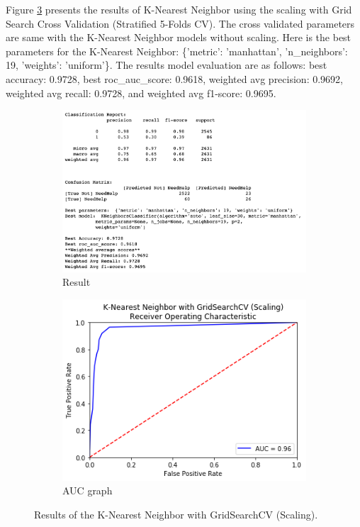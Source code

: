 \documentclass[11pt]{article}
\begin{document}
\begin{itemize}
%
Figure \ref{fig:knear_gridcv} presents 
the results of K-Nearest Neighbor using the scaling with Grid Search Cross Validation (Stratified 5-Folds CV). The cross validated parameters are same with the K-Nearest Neighbor models without scaling.
%
Here is the best parameters for the K-Nearest Neighbor: 
\{'metric': 'manhattan', 'n\_neighbors': 19, 'weights': 'uniform'\}.
%
The results model evaluation are as follows:
best accuracy: 0.9728,
best roc\_auc\_score: 0.9618,
weighted avg precision: 0.9692,
weighted avg recall: 0.9728, and
weighted avg f1-score: 0.9695.
%
\begin{figure}[h]
\centering
\begin{subfigure}{0.6\textwidth}
         \centering
         \includegraphics[width=\textwidth]{knear_gridcv.png}
         \caption{Result}
         \label{fig:knear_gridcv_report}
\end{subfigure}
\hfill
\begin{subfigure}{0.38\textwidth}
         \centering
         \includegraphics[width=\textwidth]{knear_gridcv_auc.png}
         \caption{AUC graph}
         \label{fig:knear_gridcv_auc}
\end{subfigure}
\caption{Results of the K-Nearest Neighbor with GridSearchCV (Scaling).}
\label{fig:knear_gridcv}
\end{figure}

\end{itemize}
\end{document}
